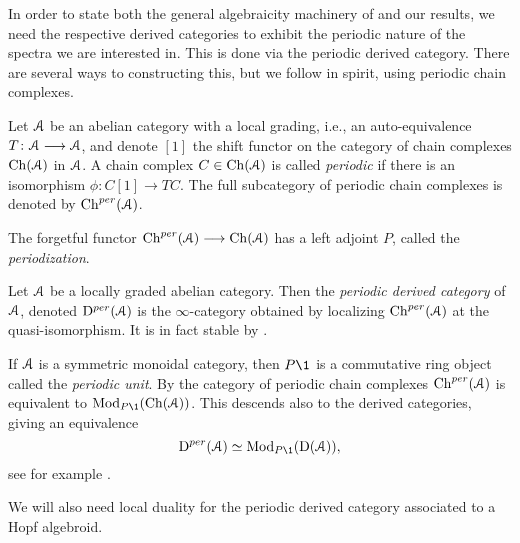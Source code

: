 In order to state both the general algebraicity machinery of \cite{patchkoria-pstragowski_2021} and our results, we need the respective derived categories to exhibit the periodic nature of the spectra we are interested in. This is done via the periodic derived category. There are several ways to constructing this, but we follow \cite{franke_96} in spirit, using periodic chain complexes. 

\begin{definition}
    \label{ch1:def:periodic-chain-complex}
    Let $\EuScript{A}$ be an abelian category with a local grading, i.e., an auto-equivalence $T\colon \EuScript{A}\longrightarrow\EuScript{A}$, and denote $[1]$ the shift functor on the category of chain complexes $\mathrm{Ch}(\EuScript{A})$ in $\EuScript{A}$. A chain complex $C\in \mathrm{Ch}(\EuScript{A})$ is called \emph{periodic} if there is an isomorphism $\phi\colon C[1]\longrightarrow TC$. The full subcategory of periodic chain complexes is denoted by $\mathrm{Ch}^{per}(\EuScript{A})$. 
\end{definition}

\begin{definition}
    The forgetful functor $\mathrm{Ch}^{per}(\EuScript{A})\longrightarrow \mathrm{Ch}(\EuScript{A})$ has a left adjoint $P$, called the \emph{periodization}. 
\end{definition}

\begin{definition}
    \label{ch1:def:periodic-derived-category}
    Let $\EuScript{A}$ be a locally graded abelian category. Then the \emph{periodic derived category} of $\EuScript{A}$, denoted $\mathrm{D}^{per}(\EuScript{A})$ is the $\infty$-category obtained by localizing $\mathrm{Ch}^{per}(\EuScript{A})$ at the quasi-isomorphism. It is in fact stable by \cite[7.8]{patchkoria-pstragowski_2021}. 
\end{definition}

\begin{remark}
    \label{ch1:rm:periodic-derived-as-modules}
    If $\EuScript{A}$ is a symmetric monoidal category, then $P\1$ is a commutative ring object called the \emph{periodic unit}. By \cite[2.3]{barnes-roitzheim_2011} the category of periodic chain complexes $\mathrm{Ch}^{per}(\EuScript{A})$ is equivalent to $\Mod_{P\1}(\Ch(\A))$. This descends also to the derived categories, giving an equivalence 
    $$\Dper(\A)\simeq \Mod_{P\1}(\Der(\A)),$$
    see for example \cite[3.7]{pstragowski_2021}. 
\end{remark}

We will also need local duality  for the periodic derived category associated to a Hopf algebroid. 

